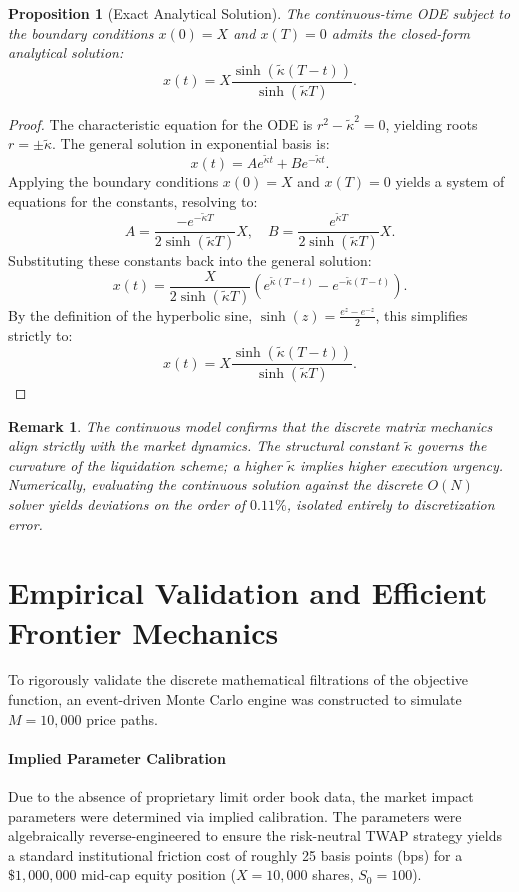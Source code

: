 \documentclass[11pt,a4paper]{article}
\newtheorem{proposition}[theorem]{Proposition}
\newtheorem{remark}[theorem]{Remark}
\begin{document}
\begin{proposition}[Exact Analytical Solution]
The continuous-time ODE subject to the boundary conditions $x(0) = X$ and $x(T) = 0$ admits the closed-form analytical solution:
\[ x(t) = X \frac{\sinh(\tilde{\kappa}(T-t))}{\sinh(\tilde{\kappa} T)}. \]
\end{proposition}

\begin{proof}
The characteristic equation for the ODE is $r^2 - \tilde{\kappa}^2 = 0$, yielding roots $r = \pm \tilde{\kappa}$. The general solution in exponential basis is:
\[ x(t) = A e^{\tilde{\kappa}t} + B e^{-\tilde{\kappa}t}. \]
Applying the boundary conditions $x(0) = X$ and $x(T) = 0$ yields a system of equations for the constants, resolving to:
\[ A = \frac{-e^{-\tilde{\kappa}T}}{2\sinh(\tilde{\kappa}T)}X, \quad B = \frac{e^{\tilde{\kappa}T}}{2\sinh(\tilde{\kappa}T)}X. \]
Substituting these constants back into the general solution:
\[ x(t) = \frac{X}{2\sinh(\tilde{\kappa}T)} \left( e^{\tilde{\kappa}(T-t)} - e^{-\tilde{\kappa}(T-t)} \right). \]
By the definition of the hyperbolic sine, $\sinh(z) = \frac{e^z - e^{-z}}{2}$, this simplifies strictly to:
\[ x(t) = X \frac{\sinh(\tilde{\kappa}(T-t))}{\sinh(\tilde{\kappa}T)}. \]
\end{proof}

\begin{remark}
The continuous model confirms that the discrete matrix mechanics align strictly with the market dynamics. The structural constant $\tilde{\kappa}$ governs the curvature of the liquidation scheme; a higher $\tilde{\kappa}$ implies higher execution urgency. Numerically, evaluating the continuous solution against the discrete $O(N)$ solver yields deviations on the order of $0.11\%$, isolated entirely to discretization error.
\end{remark}

\section{Empirical Validation and Efficient Frontier Mechanics}

To rigorously validate the discrete mathematical filtrations of the objective function, an event-driven Monte Carlo engine was constructed to simulate $M=10,000$ price paths. 

\paragraph{Implied Parameter Calibration}
Due to the absence of proprietary limit order book data, the market impact parameters were determined via implied calibration. The parameters were algebraically reverse-engineered to ensure the risk-neutral TWAP strategy yields a standard institutional friction cost of roughly 25 basis points (bps) for a $\$1,000,000$ mid-cap equity position ($X = 10,000$ shares, $S_0 = 100$). 
\end{document}
